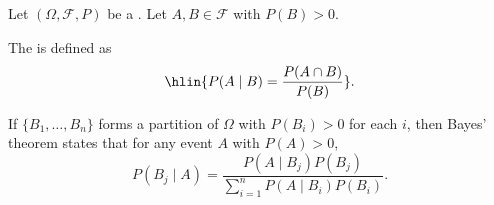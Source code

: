 \begin{definition} \label{definition:conditional_probability_and_bayes_theorem}
Let $(\Omega, \mathcal{F}, P)$ be a . Let $A, B \in \mathcal{F}$ with $P(B) > 0$.

The  is defined as
$$\hlin{P(A \mid B) = \frac{P(A \cap B)}{P(B)}}.$$

If $\{B_1, \dots, B_n\}$ forms a partition of $\Omega$ with $P(B_i) > 0$ for each $i$, then Bayes' theorem states that for any event $A$ with $P(A) > 0$,
$$P(B_j \mid A) = \frac{P(A \mid B_j) P(B_j)}{\sum_{i=1}^n P(A \mid B_i) P(B_i)}.$$
\end{definition}
